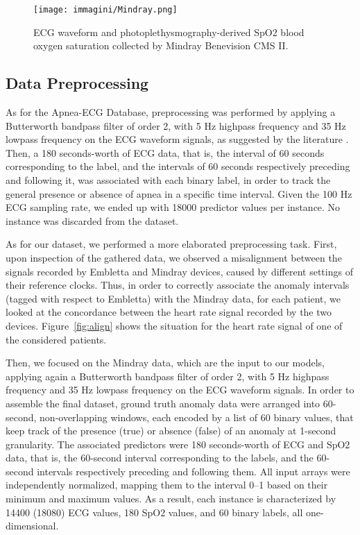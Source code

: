 \documentclass[5p,twocolumn,lefttitle]{elsarticle}
\begin{document}
\begin{figure}[t]
    \centering
    \texttt{[image: immagini/Mindray.png]}
    \caption{ECG waveform and photoplethysmography-derived SpO2 blood oxygen saturation collected by Mindray Benevision CMS II.}
    \label{fig:mindray}
\end{figure}





\subsection{Data Preprocessing}
\label{sec:data_preproc}


As for the Apnea-ECG Database, preprocessing was performed by applying a Butterworth bandpass filter of order 2, with 5 Hz highpass frequency and 35 Hz lowpass frequency on the ECG waveform signals, as suggested by the literature \cite{mostafa2019systematic}. Then, a 180 seconds-worth of ECG data, that is, the interval of 60 seconds corresponding to the label, and the intervals of 60 seconds respectively preceding and following it, was associated with each binary label, in order to track the general presence or absence of apnea in a specific time interval. Given the 100 Hz ECG sampling rate, we ended up with 18000 predictor values per instance. No instance was discarded from the dataset.

As for our dataset, we performed a more elaborated preprocessing task. 
First, upon inspection of the gathered data, we observed a misalignment between the signals recorded by Embletta and Mindray devices, caused by different settings of their reference clocks. Thus, in order to correctly associate the anomaly intervals (tagged with respect to Embletta) with the Mindray data, for each patient, we looked at the concordance between the heart rate signal recorded by the two devices. Figure~\ref{fig:align} shows the situation for the heart rate signal of one of the considered patients.

Then, we focused on the Mindray data, which are the input to our models, applying again a Butterworth bandpass filter of order 2, with 5 Hz highpass frequency and 35 Hz lowpass frequency on the ECG waveform signals. 
In order to assemble the final dataset, ground truth anomaly data were arranged into 60-second, non-overlapping windows, each encoded by a list of 60 binary values, that keep track of the presence (true) or absence (false) of an anomaly at 1-second granularity. The associated predictors were 180 seconds-worth of ECG and SpO2 data, that is, the 60-second interval corresponding to the labels, and the 60-second intervals respectively preceding and following them. 
All input arrays were independently normalized, mapping them to the interval 0--1 based on their minimum and maximum values. As a result, each instance is characterized by 14400 (18080) ECG values, 180 SpO2 values, and 60 binary labels, all one-dimensional.
\end{document}
